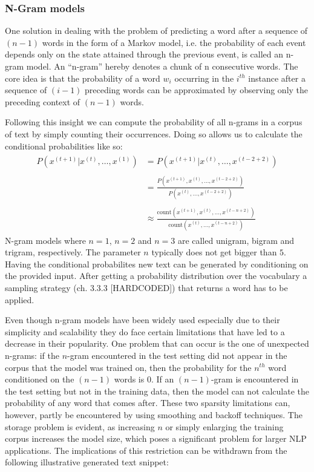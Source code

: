 \subsubsection{N-Gram models}
\label{sub:n_gram_models}

One solution in dealing with the problem of predicting a word after a sequence of $ (n - 1) $
words in the form of a Markov model, i.e. the probability of each event depends only on the state
attained through the previous event, is called an n-gram model. An “n-gram” hereby denotes a chunk 
of n consecutive words. The core idea is that the probability of a word $ w_i $ occurring in the 
$ i^{th} $ instance after a sequence of $ (i - 1) $ preceding words can be approximated by observing 
only the preceding context of $ (n - 1) $ words.

Following this insight we can compute the probability of all n-grams in a corpus of text by simply counting their occurrences.
Doing so allows us to calculate the conditional probabilities like so:
\begin{align}
    \begin{split}
        P(x^{(t+1)} | x^{(t)}, \dots, x^{(1)}) &= P(x^{(t+1)} | x^{(t)}, \dots, x^{(t - 2 + 2)}) \\ \\
        &= \frac{P(x^{(t+1)}, x^{(t)}, \dots, x^{(t - 2 + 2)})}{P(x^{(t)}, \dots, x^{(t - 2 + 2)})} \\ \\
        &\approx \frac{\text{count}(x^{(t+1)}, x^{(t)}, \dots, x^{(t - n + 2)})}{\text{count}(x^{(t)}, \dots, x^{(t - n + 2)})}
    \end{split}
\end{align}
N-gram models where $ n = 1 $, $ n = 2 $ and $ n = 3 $ are called unigram, bigram and trigram, respectively. The parameter $ n $ typically does not get bigger than $ 5 $. Having the conditional probabilites new text can be generated by conditioning on the provided input. After getting a probability distribution over the vocabulary a sampling strategy (ch. 3.3.3 [HARDCODED]) that returns a word has to be applied.

Even though n-gram models have been widely used especially due to their simplicity and scalability they do face certain limitations that have led to a decrease in their popularity. One problem that can occur is the one of unexpected n-grams: if the $ n $-gram encountered in the test setting did not appear in the corpus that the model was trained on, then the probability for the $ n^{th} $ word conditioned on the $ (n-1) $ words is $ 0 $. If an $ (n-1) $-gram is encountered in the test setting but not in the training data, then the model can not calculate the probability of any word that comes after. These two sparsity limitations can, however, partly be encountered by using smoothing and backoff techniques. The storage problem is evident, as increasing $ n $ or simply enlarging the training corpus increases the model size, which poses a significant problem for larger NLP applications. The implications of this restriction can be withdrawn from the following illustrative generated text snippet:

